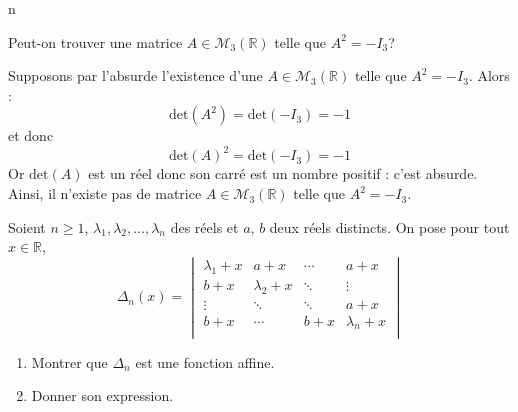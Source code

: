 n\documentclass[a4paper,10pt]{report}
\begin{document}
\begin{Exercice}{} Peut-on trouver une matrice $A \in \mathcal{M}_3(\mathbb{R})$ telle que $A^2= - I_3$?
\end{Exercice}

\corr Supposons par l'absurde l'existence d'une $A \in \mathcal{M}_3(\mathbb{R})$ telle que $A^2= - I_3$. Alors :
$$ \textrm{det}(A^2) = \textrm{det}(-I_3) = - 1$$
et donc 
$$ \textrm{det}(A)^2 = \textrm{det}(-I_3) = - 1$$
Or $\textrm{det}(A)$ est un réel donc son carré est un nombre positif : c'est absurde. Ainsi, il n'existe pas de matrice $A \in \mathcal{M}_3(\mathbb{R})$ telle que $A^2= - I_3$.

\begin{Exercice}{} Soient $n \geq 1$, $\lambda_1 ,\lambda_2 ,\ldots,\lambda_n$ des réels et $a$, $b$ deux réels distincts. On pose pour tout $x \in \mathbb{R}$,
    \[
    \Delta_n(x) =
    \begin{vmatrix}
        {\lambda_1 + x} & {a + x} & \cdots & {a + x} \\
        {b + x} & {\lambda_2 + x} & \ddots & \vdots \\
        \vdots & \ddots & \ddots & {a + x} \\
        {b + x} & \cdots & {b + x} & {\lambda_n + x} \\
    \end{vmatrix}    
    \]
    \begin{enumerate}
      \item Montrer que $\Delta_n$ est une fonction affine.
      \item Donner son expression.
    \end{enumerate}
\end{Exercice}

\corr 
\end{document}

